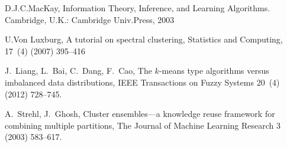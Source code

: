 \documentclass[review]{elsarticle}
\begin{document}
\begin{thebibliography}{10}
D.J.C.MacKay, Information Theory, Inference, and Learning Algorithms. Cambridge, U.K.: Cambridge Univ.Press, 2003

U.Von Luxburg, A tutorial on spectral clustering, Statistics and Computing, 17~(4) (2007) 395--416

J.~Liang, L.~Bai, C.~Dang, F.~Cao, The $k$-means type algorithms versus imbalanced data distributions, IEEE Transactions on Fuzzy Systems 20~(4) (2012) 728--745.

A.~Strehl, J.~Ghosh, Cluster ensembles---a knowledge reuse framework for combining multiple partitions, The Journal of Machine Learning Research 3 (2003) 583--617.

\end{thebibliography}
\end{document}
